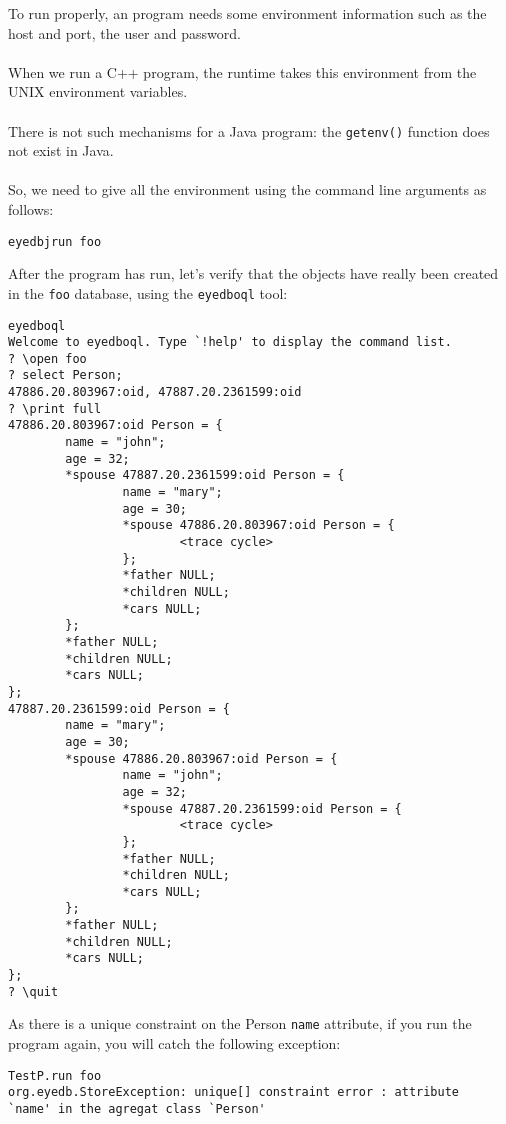 To run properly, an \eyedb program needs some environment information such
as the \eyedb host and port, the \eyedb user and password.
\\
\\
When we run a C++ program, the \eyedb runtime takes this environment
from the UNIX environment variables.
\\
\\
There is not such mechanisms for a Java program: the \texttt{getenv()} function
does not exist in Java.
\\
\\
So, we need to give all the environment using the command line arguments
as follows:
\verbsize \begin{verbatim}
eyedbjrun foo
\end{verbatim}
\normalsize
After the program has run, let's verify that the objects have really been
created in the \texttt{foo} database, using the \texttt{eyedboql} tool:
{\verbsize \begin{verbatim}
eyedboql
Welcome to eyedboql. Type `!help' to display the command list.
? \open foo
? select Person;
47886.20.803967:oid, 47887.20.2361599:oid
? \print full
47886.20.803967:oid Person = { 
        name = "john";
        age = 32;
        *spouse 47887.20.2361599:oid Person = { 
                name = "mary";
                age = 30;
                *spouse 47886.20.803967:oid Person = { 
                        <trace cycle>
                };
                *father NULL;
                *children NULL;
                *cars NULL;
        };
        *father NULL;
        *children NULL;
        *cars NULL;
};
47887.20.2361599:oid Person = { 
        name = "mary";
        age = 30;
        *spouse 47886.20.803967:oid Person = { 
                name = "john";
                age = 32;
                *spouse 47887.20.2361599:oid Person = { 
                        <trace cycle>
                };
                *father NULL;
                *children NULL;
                *cars NULL;
        };
        *father NULL;
        *children NULL;
        *cars NULL;
};
? \quit
\end{verbatim}
}
As there is a unique constraint on the Person \texttt{name} attribute,
if you run the program again, you will catch the following exception:
{\verbsize \begin{verbatim}
TestP.run foo
org.eyedb.StoreException: unique[] constraint error : attribute
`name' in the agregat class `Person'
\end{verbatim}
}
